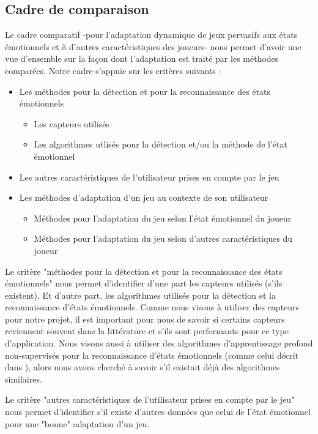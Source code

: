 \documentclass{article}
\begin{document}
	\subsection{Cadre de comparaison}
		Le cadre comparatif -pour l'adaptation dynamique de jeux pervasifs aux états émotionnels et à d'autres caractéristiques des joueurs- nous permet d'avoir une vue d'ensemble sur la façon dont l'adaptation est traité par les méthodes comparées.
		Notre cadre s'appuie sur les critères suivants :
		\begin{itemize}
			\item Les méthodes pour la détection et pour la reconnaissance des états émotionnels
			\begin{itemize}
				\item Les capteurs utilisés
				\item Les algorithmes utlisés pour la détection et/ou la méthode de l'état émotionnel
			\end{itemize}
			\item Les autres caractéristiques de l'utilisateur prises en compte par le jeu
			\item Les méthodes d'adaptation d'un jeu au contexte de son utilisateur
			\begin{itemize}
				\item Méthodes pour l'adaptation du jeu selon l'état émotionnel du joueur
				\item Méthodes pour l'adaptation du jeu selon d'autres caractéristiques du joueur
			\end{itemize}
		\end{itemize}\par
		Le critère "méthodes pour la détection et pour la reconnaissance des états émotionnels" nous permet d'identifier d'une part les capteurs utilisés (s'ils existent).
		Et d'autre part, les algorithmes utilisés pour la détection et la reconnaissance d'états émotionnels.
		Comme nous visons à utiliser des capteurs pour notre projet, il est important pour nous de savoir si certains capteurs reviennent souvent dans la littérature et s'ils sont performants pour ce type d'application.
		Nous visons aussi à utiliser des algorithmes d'apprentissage profond non-supervisés pour la reconnaissance d'états émotionnels (comme celui décrit dans \cite{gal_et_al._2020}), alors nous avons cherché à savoir s'il existait déjà des algorithmes similaires.\par
		Le critère "autres caractéristiques de l'utilisateur prises en compte par le jeu" nous permet d'identifier s'il existe d'autres données que celui de l'état émotionnel pour une "bonne" adaptation d'un jeu. 
\end{document}
